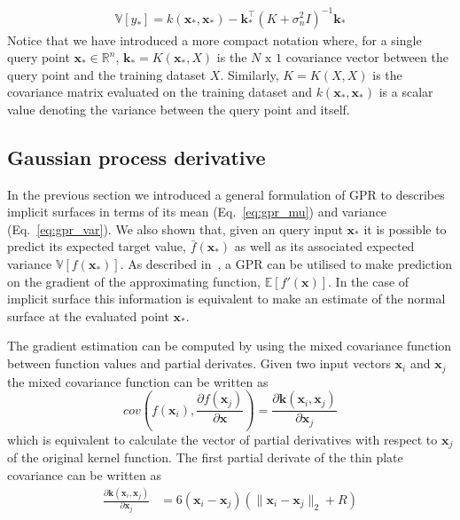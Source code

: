 \begin{eqnarray}
\label{eq:gpr_var}
\mathbb{V}[y_*]=k(\mathbf{x}_*,\mathbf{x}_*)-\mathbf{k}_*^\top(K+\sigma_n^2I)^{-1}\mathbf{k}_*
\end{eqnarray}
Notice that we have introduced a more compact notation where, for a single query point $\mathbf{x}_*\in\mathbb{R}^n$, $\mathbf{k}_*=K(\mathbf{x}_*,X)$ is the $N\text{ x }1$ covariance vector between the query point and the training dataset $X$. Similarly, $K=K(X,X)$ is the covariance matrix evaluated on the training dataset and $k(\mathbf{x}_*,\mathbf{x}_*)$ is a scalar value denoting the variance between the query point and itself.

\subsection{Gaussian process derivative}

In the previous section we introduced a general formulation of GPR to describes implicit surfaces in terms of its mean (Eq.~\ref{eq:gpr_mu}) and variance (Eq.~\ref{eq:gpr_var}). We also shown that, given an query input $\mathbf{x}_*$ it is possible to predict its expected target value, $\bar{f}(\mathbf{x}_*)$ as well as its associated expected variance $\mathbb{V}[f(\mathbf{x}_*)]$. As described in~\cite{Rasmussen2006Gaussian}, a GPR can be utilised to make prediction on the gradient of the approximating function, $\mathbb{E}[f'(\mathbf{x})]$. In the case of implicit surface this information is equivalent to make an estimate of the normal surface at the evaluated point $\mathbf{x}_*$.

The gradient estimation can be computed by using the mixed covariance function between function values and partial derivates. Given two input vectors $\mathbf{x}_i$ and $\mathbf{x}_j$ the mixed covariance function can be written as
$$
cov(f(\mathbf{x}_i), \frac{\partial f(\mathbf{x}_j)}{\partial\mathbf{x}})=\frac{\partial\mathbf{k}(\mathbf{x}_i, \mathbf{x}_j)}{\partial\mathbf{x}_j}
$$
which is equivalent to calculate the vector of partial derivatives with respect to $\mathbf{x}_j$ of the original kernel function. The first partial derivate of the thin plate covariance can be written as
\begin{eqnarray}
\label{eq:gpr_der} 
\frac{\partial\mathbf{k}(\mathbf{x}_i,\mathbf{x}_j)}{\partial\mathbf{x}_j}&=6(\mathbf{x}_i-\mathbf{x}_j)(\|\mathbf{x}_i-\mathbf{x}_j\|_2 + R)
\end{eqnarray}

